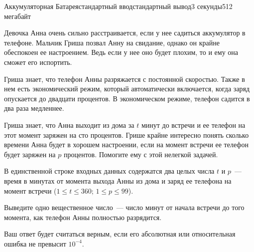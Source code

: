 \begin{problem}{Аккумуляторная Батарея}{стандартный ввод}{стандартный вывод}{3 секунды}{512 мегабайт}

Девочка Анна очень сильно расстраивается, если у нее садиться аккумулятор в телефоне.
Мальчик Гриша позвал Анну на свидание, однако он крайне обеспокоен ее настроением. Ведь если у нее оно будет плохим, то и ему она сможет его испортить.

Гриша знает, что телефон Анны разряжается с постоянной скоростью. Также в нем есть экономический режим, который автоматически включается, когда заряд опускается до двадцати процентов. В экономическом режиме, телефон садится в два раза медленнее.

Гриша знает, что Анна выходит из дома за $t$ минут до встречи и ее телефон на этот момент заряжен на сто процентов.
Грише крайне интересно понять сколько времени Анна будет в хорошем настроении, если на момент встречи ее телефон будет заряжен на $p$ процентов. Помогите ему с этой нелегкой задачей.

\InputFile
В единственной строке входных данных содержатся два целых числа $t$ и $p$~--- время в минутах от момента выхода Анны из дома и заряд ее телефона на момент встречи ($1 \le t \le 360$; $1 \le p \le 99$).

\OutputFile
Выведите одно вещественное число~--- число минут от начала встречи до того момента, как телефон Анны полностью разрядится.

Ваш ответ будет считаться верным, если его абсолютная или относительная ошибка не превысит $10^{-4}$.

\Examples

\begin{example}
%
%
\end{example}

\end{problem}


